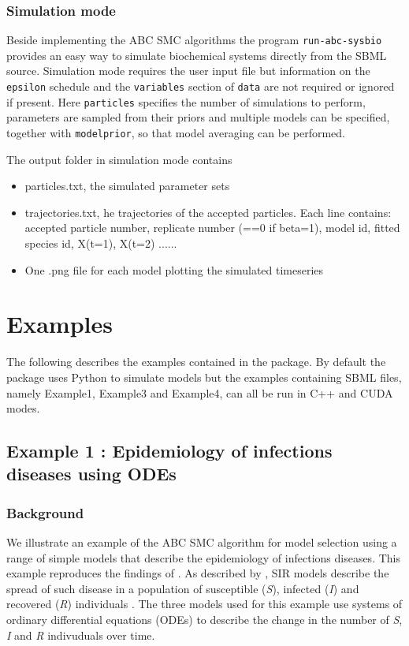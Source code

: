 \documentclass[a4paper]{report}
\begin{document}
\subsection{Simulation mode}
Beside implementing the ABC SMC algorithms the program \verb$run-abc-sysbio$ provides an easy way to simulate biochemical systems directly from the SBML source. Simulation mode requires the user input file but information on the \verb$epsilon$ schedule and the \verb$variables$ section of \verb$data$ are not required or ignored if present. Here \verb$particles$ specifies the number of simulations to perform, parameters are sampled from their priors and multiple models can be specified, together with \verb$modelprior$, so that model averaging can be performed.

The output folder in simulation mode contains
\begin{itemize}
\item particles.txt, the simulated parameter sets
\item trajectories.txt, he trajectories of the accepted particles. Each line contains:\\
	 accepted particle number, replicate number (==0 if beta=1), model id, fitted species id, X(t=1), X(t=2) ...... 
\item One .png file for each model plotting the simulated timeseries
\end{itemize}

\chapter{Examples}
\label{examples}
The following describes the examples contained in the package. By default the package uses Python to simulate models but the examples containing SBML files, namely Example1, Example3 and Example4, can all be run in C++ and CUDA modes.

\section{Example 1 : Epidemiology of infections diseases using ODEs}
\subsection{Background}
We illustrate an example of the ABC SMC algorithm for model selection using a range of simple models that describe the epidemiology of infections diseases. This example reproduces the findings of \citep{Toni2009}. As described by \citep{Toni2009}, SIR models describe the spread of such disease in a population of susceptible (\emph{S}), infected (\emph{I}) and recovered (\emph{R}) individuals \citep{Anderson1991}. The three models used for this example use systems of ordinary differential equations (ODEs) to describe the change in the number of \emph{S}, \emph{I} and \emph{R} indivuduals over time.
\end{document}
